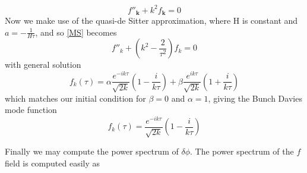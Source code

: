 \documentclass[a4paper,10pt]{article}
\renewcommand{\v}[1]{\mathbf{#1}}
\begin{document}
\begin{equation}
f''_{\v{k}} + k^2f_{\v{k}} = 0
\end{equation}
Now we make use of the quasi-de Sitter approximation, where H is constant and $a=-\frac{1}{H\tau}$, and so \ref{MS} becomes
\begin{equation}
f''_k + (k^2-\frac{2}{\tau^2})f_k = 0
\end{equation}
with general solution
\begin{equation}
f_k(\tau) = \alpha \frac{e^{-ik\tau}}{\sqrt{2k}}\left(1-\frac{i}{k\tau}\right) + \beta \frac{e^{ik\tau}}{\sqrt{2k}}\left(1+\frac{i}{k\tau}\right)
\end{equation}
which matches our initial condition for $\beta = 0$ and $\alpha=1$, giving the Bunch Davies mode function 
\begin{equation}
f_k(\tau) = \frac{e^{-ik\tau}}{\sqrt{2k}}\left(1-\frac{i}{k\tau}\right)
\end{equation}

Finally we may compute the power spectrum of $\delta\phi$. The power spectrum of the $f$ field is computed easily as 
\end{document}

